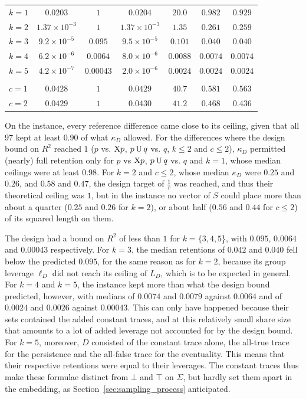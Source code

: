 \documentclass[titlepage,a4paper,11pt]{report}
\begin{document}
\begin{table}[ht]
\begin{tabular}{lcccccc}
            \quad $k=1$ & $0.0203$ & $1$ & $0.0204$ & $20.0$ & $0.982$ & $0.929$ \\
            \quad $k=2$ & $1.37\times10^{-3}$ & $1$ & $1.37\times10^{-3}$ & $1.35$ & $0.261$ & $0.259$ \\
            \quad $k=3$ & $9.2\times10^{-5}$ & $0.095$ & $9.5\times10^{-5}$ & $0.101$ & $0.040$ & $0.040$ \\
            \quad $k=4$ & $6.2\times10^{-6}$ & $0.0064$ & $8.0\times10^{-6}$ & $0.0088$ & $0.0074$ & $0.0074$ \\
            \quad $k=5$ & $4.2\times10^{-7}$ & $0.00043$ & $2.0\times10^{-6}$ & $0.0024$ & $0.0024$ & $0.0024$ \\
            \addlinespace
            \multicolumn{7}{l}{$c$ changes of $p$ vs.\ $\bot$} \\
            \quad $c=1$ & $0.0428$ & $1$ & $0.0429$ & $40.7$ & $0.581$ & $0.563$ \\
            \quad $c=2$ & $0.0429$ & $1$ & $0.0430$ & $41.2$ & $0.468$ & $0.436$ \\
            \bottomrule
        \end{tabular}
    \end{table}

    On the instance, every reference difference came close to its ceiling, given that all $97$ kept at least $0.90$ of what $\kappa_D$ allowed. For the differences where the design bound on $R^2$ reached $1$ ($p$ vs. $\text{X} p$, $p\,\text{U}\,q$ vs. $q$, $k\le2$ and $c\le2$), $\kappa_D$ permitted (nearly) full retention only for $p$ vs $\text{X} p$, $p\,\text{U}\,q$ vs. $q$ and $k=1$, whose median ceilings were at least $0.98$. For $k=2$ and $c\le2$, whose median $\kappa_D$ were $0.25$ and $0.26$, and $0.58$ and $0.47$, the design target of $\frac1r$ was reached, and thus their theoretical ceiling was $1$, but in the instance no vector of $S$ could place more than about a quarter ($0.25$ and $0.26$ for $k=2$), or about half ($0.56$ and $0.44$ for $c\le2$) of its squared length on them.

    The design had a bound on $R^2$ of less than $1$ for $k=\{3,4,5$\}, with $0.095$, $0.0064$ and $0.00043$ respectively. For $k=3$, the median retentions of $0.042$ and $0.040$ fell below the predicted $0.095$, for the same reason as for $k=2$, because its group leverage $\ell_D$ did not reach its ceiling of $L_D$, which is to be expected in general. For $k=4$ and $k=5$, the instance kept more than what the design bound predicted, however, with medians of $0.0074$ and $0.0079$ against $0.0064$ and of $0.0024$ and $0.0026$ against $0.00043$. This can only have happened because their sets contained the added constant traces, and at this relatively small share size that amounts to a lot of added leverage not accounted for by the design bound. For $k=5$, moreover, $D$ consisted of the constant trace alone, the all-true trace for the persistence and the all-false trace for the eventuality. This means that their respective retentions were equal to their leverages. The constant traces thus make these formulae distinct from $\bot$ and $\top$ on $\widehat\Sigma$, but hardly set them apart in the embedding, as Section~\ref{sec:sampling_process} anticipated. 
    
\end{document}
